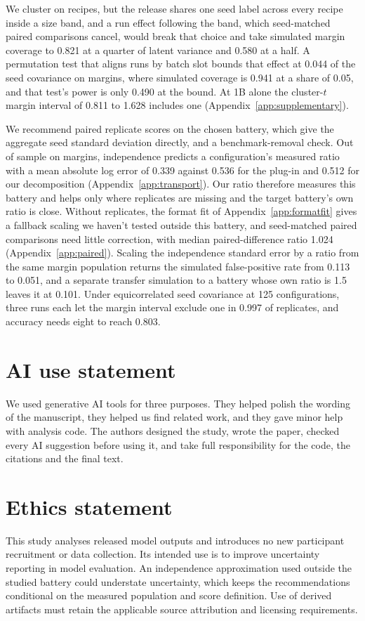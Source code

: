 We cluster on recipes, but the release shares one seed label across every recipe inside a size band, and a run effect following the band, which seed-matched paired comparisons cancel, would break that choice and take simulated margin coverage to 0.821 at a quarter of latent variance and 0.580 at a half. A permutation test that aligns runs by batch slot bounds that effect at 0.044 of the seed covariance on margins, where simulated coverage is 0.941 at a share of 0.05, and that test's power is only 0.490 at the bound. At 1B alone the cluster-$t$ margin interval of 0.811 to 1.628 includes one (Appendix~\ref{app:supplementary}).

We recommend paired replicate scores on the chosen battery, which give the aggregate seed standard deviation directly, and a benchmark-removal check. Out of sample on margins, independence predicts a configuration's measured ratio with a mean absolute log error of 0.339 against 0.536 for the plug-in and 0.512 for our decomposition (Appendix~\ref{app:transport}). Our ratio therefore measures this battery and helps only where replicates are missing and the target battery's own ratio is close. Without replicates, the format fit of Appendix~\ref{app:formatfit} gives a fallback scaling we haven't tested outside this battery, and seed-matched paired comparisons need little correction, with median paired-difference ratio 1.024 (Appendix~\ref{app:paired}). Scaling the independence standard error by a ratio from the same margin population returns the simulated false-positive rate from 0.113 to 0.051, and a separate transfer simulation to a battery whose own ratio is 1.5 leaves it at 0.101. Under equicorrelated seed covariance at 125 configurations, three runs each let the margin interval exclude one in 0.997 of replicates, and accuracy needs eight to reach 0.803.

\label{maintext:end}
\section*{AI use statement}
We used generative AI tools for three purposes. They helped polish the wording of the manuscript, they helped us find related work, and they gave minor help with analysis code. The authors designed the study, wrote the paper, checked every AI suggestion before using it, and take full responsibility for the code, the citations and the final text.

\section*{Ethics statement}
This study analyses released model outputs and introduces no new participant recruitment or data collection. Its intended use is to improve uncertainty reporting in model evaluation. An independence approximation used outside the studied battery could understate uncertainty, which keeps the recommendations conditional on the measured population and score definition. Use of derived artifacts must retain the applicable source attribution and licensing requirements.

